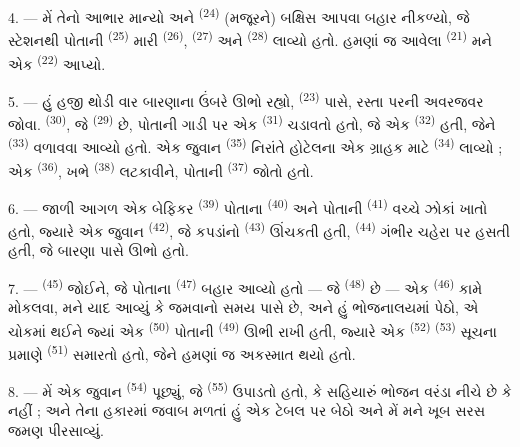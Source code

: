 4. --- મેં તેનો આભાર માન્યો અને 
\textsuperscript{(24)} (મજૂરને) બક્ષિસ આપવા બહાર નીકળ્યો, જે સ્ટેશનથી
પોતાની  \textsuperscript{(25)} મારી  \textsuperscript{(26)},  \textsuperscript{(27)}
અને  \textsuperscript{(28)} લાવ્યો હતો.
હમણાં જ આવેલા  \textsuperscript{(21)} મને એક
 \textsuperscript{(22)} આપ્યો.

5. --- હું હજી થોડી વાર બારણાના ઉંબરે ઊભો રહ્યો, 
\textsuperscript{(23)} પાસે, રસ્તા પરની અવરજવર જોવા.
 \textsuperscript{(30)}, જે 
\textsuperscript{(29)} છે, પોતાની ગાડી પર એક 
\textsuperscript{(31)} ચડાવતો હતો, જે એક 
\textsuperscript{(32)} હતી, જેને 
\textsuperscript{(33)} વળાવવા આવ્યો હતો. એક જુવાન 
\textsuperscript{(35)} નિરાંતે હોટેલના એક ગ્રાહક માટે 
\textsuperscript{(34)} લાવ્યો ; એક 
\textsuperscript{(36)}, ખભે  \textsuperscript{(38)}
લટકાવીને, પોતાની  \textsuperscript{(37)} જોતો હતો.

\VUsaut{4.0mm}
\VUsaut{3.0mm}

6. --- જાળી આગળ એક બેફિકર  \textsuperscript{(39)} પોતાના
 \textsuperscript{(40)} અને પોતાની
 \textsuperscript{(41)} વચ્ચે ઝોકાં ખાતો હતો,
જ્યારે એક જુવાન  \textsuperscript{(42)}, જે કપડાંનો
 \textsuperscript{(43)} ઊંચકતી હતી,  \textsuperscript{(44)} ગંભીર ચહેરા પર હસતી હતી, જે બારણા પાસે
ઊભો હતો.

7. ---  \textsuperscript{(45)} જોઈને, જે પોતાના
 \textsuperscript{(47)} બહાર આવ્યો હતો — જે
 \textsuperscript{(48)} છે — એક  \textsuperscript{(46)} કામે મોકલવા, મને યાદ આવ્યું કે જમવાનો
સમય પાસે છે, અને હું ભોજનાલયમાં પેઠો, એ ચોકમાં થઈને જ્યાં એક
 \textsuperscript{(50)} પોતાની 
\textsuperscript{(49)} ઊભી રાખી હતી, જ્યારે એક 
\textsuperscript{(52)}  \textsuperscript{(53)}
સૂચના પ્રમાણે  \textsuperscript{(51)}
સમારતો હતો, જેને હમણાં જ અકસ્માત થયો હતો.

8. --- મેં એક જુવાન  \textsuperscript{(54)} પૂછ્યું,
જે  \textsuperscript{(55)} ઉપાડતો હતો, કે સહિયારું
ભોજન વરંડા નીચે છે કે નહીં ; અને તેના હકારમાં જવાબ મળતાં હું એક ટેબલ
પર બેઠો અને મેં મને ખૂબ સરસ જમણ પીરસાવ્યું.

